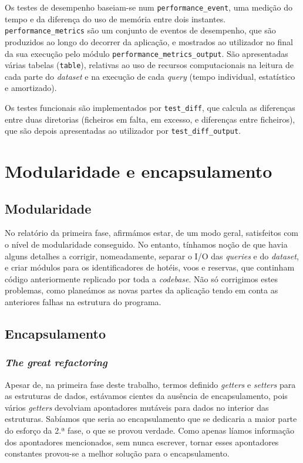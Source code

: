 \documentclass[12pt, a4paper]{article}
\begin{document}
Os testes de desempenho baseiam-se num \texttt{performance\_event}, uma medição do tempo e da
diferença do uso de memória entre dois instantes. \texttt{performance\_metrics} são um conjunto de
eventos de desempenho, que são produzidos ao longo do decorrer da aplicação, e mostrados ao
utilizador no final da sua execução pelo módulo \texttt{performance\_metrics\_output}. São
apresentadas várias tabelas (\texttt{table}), relativas ao uso de recursos computacionais na leitura
de cada parte do \emph{dataset} e na execução de cada \emph{query} (tempo individual, estatístico e
amortizado).

Os testes funcionais são implementados por \texttt{test\_diff}, que calcula as diferenças entre
duas diretorias (ficheiros em falta, em excesso, e diferenças entre ficheiros), que são depois
apresentadas ao utilizador por \texttt{test\_diff\_output}.

\section{Modularidade e encapsulamento}
\label{sec:modularity-and-encapsulation}

\subsection{Modularidade}
\label{sec:modularity}

No relatório da primeira fase, afirmámos estar, de um modo geral, satisfeitos com o nível de
modularidade conseguido. No entanto, tínhamos noção de que havia alguns detalhes a corrigir,
nomeadamente, separar o I/O das \emph{queries} e do \emph{dataset}, e criar módulos para os
identificadores de hotéis, voos e reservas, que continham código anteriormente replicado por toda a
\emph{codebase}. Não só corrigimos estes problemas, como planeámos as novas partes da aplicação
tendo em conta as anteriores falhas na estrutura do programa.

\subsection{Encapsulamento}
\label{sec:encapsulation}

\subsubsection{\emph{The great refactoring}}
\label{sec:the-great-refactoring}

Apesar de, na primeira fase deste trabalho, termos definido \emph{getters} e \emph{setters} para as
estruturas de dados, estávamos cientes da ausência de encapsulamento, pois vários \emph{getters}
devolviam apontadores mutáveis para dados no interior das estruturas. Sabíamos que seria ao
encapsulamento que se dedicaria a maior parte do esforço da 2.ª fase, o que se provou verdade. Como
apenas líamos informação dos apontadores mencionados, sem nunca escrever, tornar esses apontadores
constantes provou-se a melhor solução para o encapsulamento.
\end{document}
